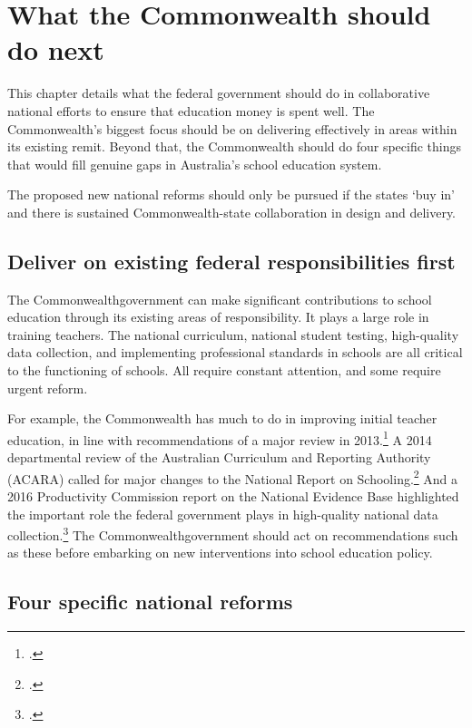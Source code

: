 \chapter{What the Commonwealth should do next}\label{chap:what_com_should_do}

This chapter details what the federal government should do in collaborative national efforts to ensure that education money is spent well. The Commonwealth’s biggest focus should be on delivering effectively in areas within its existing remit. Beyond that, the Commonwealth should do four specific things that would fill genuine gaps in Australia’s school education system. 

The proposed new national reforms should only be pursued if the states `buy in' and there is sustained Commonwealth-state collaboration in design and delivery.

\section{Deliver on existing federal responsibilities first}\label{sec:deliver-responsibilities}
The Commonwealth\space government can make significant contributions to school education through its existing areas of responsibility. It plays a large role in training teachers. The national curriculum, national student testing, high-quality data collection, and implementing professional standards in schools are all critical to the functioning of schools. All require constant attention, and some require urgent reform.

For example, the Commonwealth has much to do in improving initial teacher education, in line with recommendations of a major review in 2013.\footcite{2015AustralianGovernmentActionNowClassroomReadyTeachersReport}
A 2014 departmental review of the Australian Curriculum and Reporting Authority (ACARA) called for major changes to the National Report on Schooling.\footcite{2014AustralianGovernmentReviewoftheAustralianCurriculum}
And a 2016 Productivity Commission report on the National Evidence Base highlighted the important role the federal government plays in high-quality national data collection.\footcite{ProductivityCommission2016NationalEvidenceBase}
The Commonwealth\space government should act on recommendations such as these before embarking on new interventions into school education policy.

\section{Four specific national reforms}\label{sec:four-additional}

